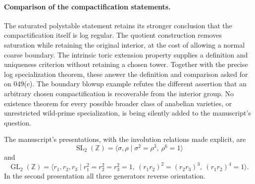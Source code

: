 \paragraph{Comparison of the compactification statements.}
The saturated polystable statement retains its stronger conclusion
that the compactification itself is log regular. The quotient
construction removes saturation while retaining the original
interior, at the cost of allowing a normal coarse boundary.
The intrinsic toric extension property supplies a definition and
uniqueness criterion without retaining a chosen tower. Together
with the precise log specialization theorem, these answer the
definition and comparison asked for on 049(c). The boundary
blowup example refutes the different assertion that an arbitrary
chosen compactification is recoverable from the interior group.
No existence theorem for every possible broader class of
anabelian varieties, or unrestricted wild-prime specialization,
is being silently added to the manuscript's question.



\begin{theorem}
\label{A:SL-GL-presentations}
The manuscript's presentations, with the involution relations made
explicit, are
\[
 \operatorname{SL}_2(\mathbb Z)
 =\langle\sigma,\rho\mid\sigma^2=\rho^3,\ \rho^6=1\rangle
\]
and
\[
 \operatorname{GL}_2(\mathbb Z)
 =\langle r_1,r_2,r_3\mid
 r_1^2=r_2^2=r_3^2=1,\
 (r_1r_2)^2=(r_2r_3)^3,\ (r_1r_2)^4=1\rangle.
\]
In the second presentation all three generators reverse orientation.
\end{theorem}

